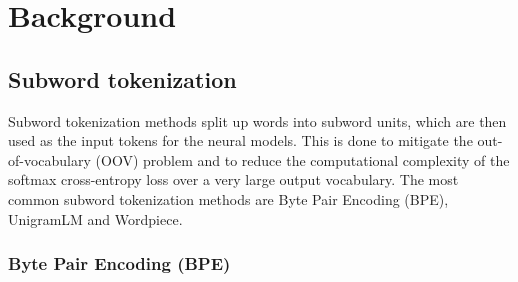 



\chapter{Background}
\label{chap:background}

\section{Subword tokenization}

Subword tokenization methods split up words into subword units, which are then used as the input tokens for the neural models. This is done to mitigate the out-of-vocabulary (OOV) problem and to reduce the computational complexity of the softmax cross-entropy loss over a very large output vocabulary. The most common subword tokenization methods are Byte Pair Encoding (BPE), UnigramLM and Wordpiece.

\subsection{Byte Pair Encoding (BPE)}

